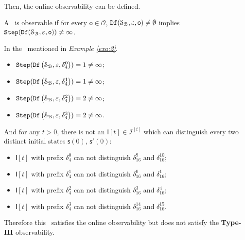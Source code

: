 

Then, the online observability can be defined.
\begin{definition}
 A \BCN\ is observable
if for every $\mathsf{o}\in  \mathcal{O}$, ${\tt Df}(\mathcal{S}_{\mathcal{B}},\varepsilon, \mathsf{o})\ne\emptyset$ implies ${\tt Step}({\tt Df}(\mathcal{S}_{\mathcal{B}},\varepsilon,\mathsf{o}))\ne\infty$.
\end{definition}


\begin{example}
In the \BCN\ mentioned in {\em Example \ref{exa:2}}.  
 \begin{itemize}
 \item ${\tt Step}({\tt Df}\left(\mathcal{S}_{\mathcal{B}},\varepsilon, \delta_{4}^0\right))=1\ne \infty$;
 \item ${\tt Step}({\tt Df}\left(\mathcal{S}_{\mathcal{B}},\varepsilon, \delta_{4}^1\right))=1\ne \infty$;
 \item ${\tt Step}({\tt Df}\left(\mathcal{S}_{\mathcal{B}},\varepsilon, \delta_{4}^2\right))=2\ne \infty$;
 \item ${\tt Step}({\tt Df}\left(\mathcal{S}_{\mathcal{B}},\varepsilon, \delta_{4}^3\right))=2\ne \infty$.
 \end{itemize}
 
 And for any $t>0$, there is not an $\mathsf{I}[t]\in\mathcal{I}^{[t]}$ which can distinguish every two distinct initial states $\mathsf{s}(0)$, $\mathsf{s}'(0)$:
\begin{itemize}
  \item $\mathsf{I}[t]$ with prefix $\delta_{4}^0$ can not distinguish $\delta_{16}^9$ and $\delta_{16}^{10}$;
  \item $\mathsf{I}[t]$ with prefix $\delta_{4}^1$ can not distinguish $\delta_{16}^0$ and $\delta_{16}^{1}$;
  \item $\mathsf{I}[t]$ with prefix $\delta_{4}^2$ can not distinguish $\delta_{16}^3$ and $\delta_{16}^{4}$;
  \item $\mathsf{I}[t]$ with prefix $\delta_{4}^3$ can not distinguish $\delta_{16}^{14}$ and $\delta_{16}^{15}$.
\end{itemize} 
Therefore this \BCN\ satisfies the online observability but does not satisfy the {\bf Type-III} observability.%
\label{exa:10}
\end{example}  

